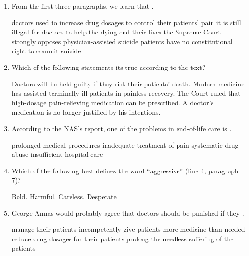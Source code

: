 \begin{enumerate}[resume]
	\item
From the first three paragraphs, we learn that \lineread.

\fourchoices
{doctors used to increase drug dosages to control their patients' pain}
{it is still illegal for doctors to help the dying end their lives}
{the Supreme Court strongly opposes physician-assisted suicide}
{patients have no constitutional right to commit suicide}


\item
Which of the following statements its true according to the text?


\fourchoices
{Doctors will be held guilty if they risk their patients' death.}
{Modern medicine has assisted terminally ill patients in painless recovery.}
{The Court ruled that high-dosage pain-relieving medication can be prescribed.}
{A doctor's medication is no longer justified by his intentions.}


\item
According to the NAS's report, one of the problems in end-of-life
care is \lineread.


\fourchoices
{prolonged medical procedures}
{inadequate treatment of pain}
{systematic drug abuse}
{insufficient hospital care}


\item
Which of the following best defines the word ``aggressive'' (line 4,
paragraph 7)?



\fourchoices
{Bold.}
{Harmful.}
{Careless.}
{Desperate}




\item
George Annas would probably agree that doctors should be punished if
they \lineread.


\fourchoices
{manage their patients incompetently}
{give patients more medicine than needed}
{reduce drug dosages for their patients}
{prolong the needless suffering of the patients}


\end{enumerate}


